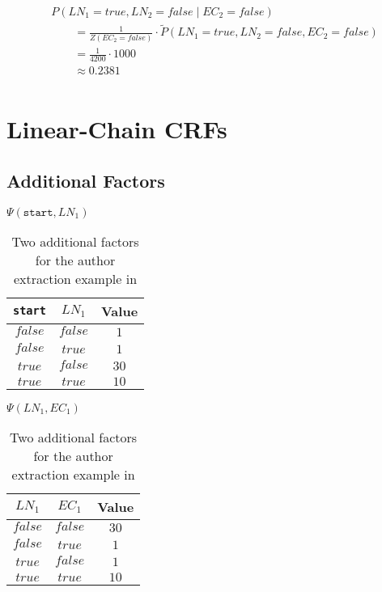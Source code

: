 \begin{subequations}
\begin{equation*}
\begin{split}
  &P(LN_1{=}\mathit{true},LN_2{=}\mathit{false}\mid EC_2{=}\mathit{false})\\
  &\hspace{2em}=\frac{1}{Z(EC_2{=}\mathit{false})}\cdot\tilde{P}\left(LN_1{=}\mathit{true},LN_2{=}\mathit{false},EC_2{=}\mathit{false}\right)\\
  &\hspace{2em}=\frac{1}{\num{4200}}\cdot\num{1000}\\
  &\hspace{2em}\approx0.2381\\
\end{split}
\end{equation*}
\end{subequations}
\section{Linear-Chain CRFs}\label{app:sec-linear-chain-crfs}
\subsection{Additional Factors}\label{app:subsec-lccrf-additional-factors}

\begin{table}[H]
\begin{minipage}{0.5\linewidth}
\centering
$\Psi(\texttt{start},LN_1)$\par
\smallskip
\begin{tabular}{c c c}
 \toprule
 \texttt{start} & $LN_1$ & Value \\
 \midrule
 $\mathit{false}$ & $\mathit{false}$ & $1$ \\
 $\mathit{false}$ & $\mathit{true}$ & $1$ \\
 $\mathit{true}$ & $\mathit{false}$ & $30$ \\
 $\mathit{true}$ & $\mathit{true}$ & $10$ \\
 \bottomrule
\end{tabular}
\end{minipage}
\hfill
\begin{minipage}{0.5\linewidth}
\centering
$\Psi(LN_1,EC_1)$\par
\smallskip
\begin{tabular}{c c c}
 \toprule
 $LN_1$ & $EC_1$ & Value \\
 \midrule
 $\mathit{false}$ & $\mathit{false}$ & $30$ \\
 $\mathit{false}$ & $\mathit{true}$ & $1$ \\
 $\mathit{true}$ & $\mathit{false}$ & $1$ \\
 $\mathit{true}$ & $\mathit{true}$ & $10$ \\
 \bottomrule
\end{tabular}
\end{minipage}
\caption{Two additional factors for the author extraction example in }
\label{tab:example-linear-chain-crf-factors}
\end{table}

